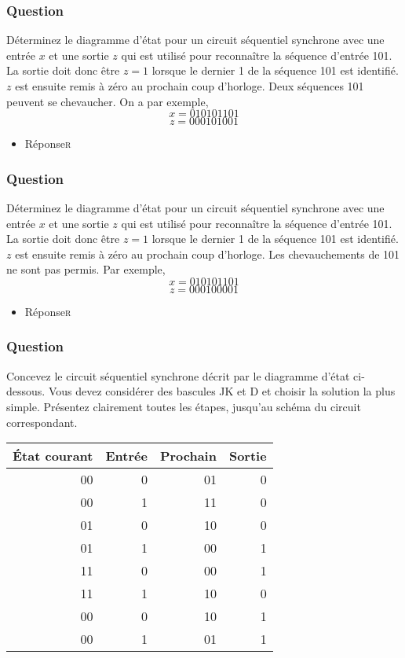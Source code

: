 \documentclass[11pt]{article}
\begin{document}
\subsubsection*{Question}
\label{sec:org1550a1b}
Déterminez le diagramme d'état pour un circuit séquentiel synchrone
  avec une entrée \(x\) et une sortie \(z\) qui est utilisé pour
  reconnaître la séquence d'entrée 101. La sortie doit donc être \(z=1\)
  lorsque le dernier 1 de la séquence 101 est identifié. \(z\) est
  ensuite remis à zéro au prochain coup d'horloge. Deux séquences 101
  peuvent se chevaucher. On a par exemple,
  $$
    x  =  010101101
    $$
  $$ z = 000101001
    $$

\begin{itemize}
\item Réponse\hfill{}\textsc{r}
\label{sec:org6089133}
\end{itemize}

\subsubsection*{Question}
\label{sec:org26adea3}
Déterminez le diagramme d'état pour un circuit séquentiel synchrone
  avec une entrée \(x\) et une sortie \(z\) qui est utilisé pour
  reconnaître la séquence d'entrée 101. La sortie doit donc être \(z=1\)
  lorsque le dernier 1 de la séquence 101 est identifié. \(z\) est
  ensuite remis à zéro au prochain coup d'horloge. Les chevauchements de 101 ne sont pas 
  permis. Par exemple,
  $$
    x = 010101101
    $$
  $$
    z = 000100001
    $$

\begin{itemize}
\item Réponse\hfill{}\textsc{r}
\label{sec:org0a64038}
\end{itemize}

\subsubsection*{Question}
\label{sec:orge801f65}
Concevez le circuit séquentiel synchrone décrit par le diagramme
  d'état ci-dessous. Vous devez considérer des bascules JK et D et
  choisir la solution la plus simple. Présentez clairement toutes les
  étapes, jusqu'au schéma du circuit correspondant.
\begin{center}
\begin{tabular}{rrrr}
État courant & Entrée & Prochain & Sortie\\
\hline
00 & 0 & 01 & 0\\
00 & 1 & 11 & 0\\
01 & 0 & 10 & 0\\
01 & 1 & 00 & 1\\
11 & 0 & 00 & 1\\
11 & 1 & 10 & 0\\
00 & 0 & 10 & 1\\
00 & 1 & 01 & 1\\
\end{tabular}
\end{center}
\end{document}
